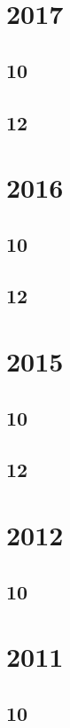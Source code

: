 \documentclass[11pt]{book}
\begin{document}
\section{2017}
\subsection{10}

\subsection{12}

\section{2016}
\subsection{10}

\subsection{12}


\section{2015}
\subsection{10}


\subsection{12}

\section{2012}
\subsection{10}


\section{2011}
\subsection{10}


\end{document}
